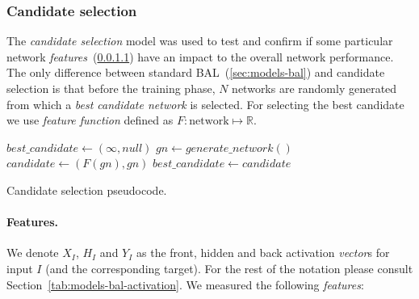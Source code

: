 \subsubsection{Candidate selection} 
\label{sec:sim-exp-candidates}

The \emph{candidate selection} model was used to test and confirm if some particular network \emph{features}~(\ref{sec:our-candidates-features}) have an impact to the overall network performance. The only difference between standard BAL~(\ref{sec:models-bal}) and candidate selection is that before the training phase, $N$ networks are randomly generated from which a \emph{best candidate network} is selected. For selecting the best candidate we use \emph{feature function} defined as $F: \mbox{network} \mapsto \mathbb{R}$. 

\begin{algorithm}[H]
  \begin{algorithmic}
    \State $best\_candidate \gets (\infty, null)$
      \State $gn \gets generate\_network()$
      \State $candidate \gets (F(gn), gn)$
        \State $best\_candidate \gets candidate$
      \EndIf
    \EndFor
  \caption{Candidate selection pseudocode.}
  \label{alg:our-candidates-pseudocode} 
  \end{algorithmic}
\end{algorithm} 

\paragraph{Features.}
\label{sec:our-candidates-features}

We denote $X_I$, $H_I$ and $Y_I$ as the front, hidden and back activation \emph{vector}s for input $I$ (and the corresponding target). For the rest of the notation please consult Section~\ref{tab:models-bal-activation}. We measured the following \emph{features}: 

